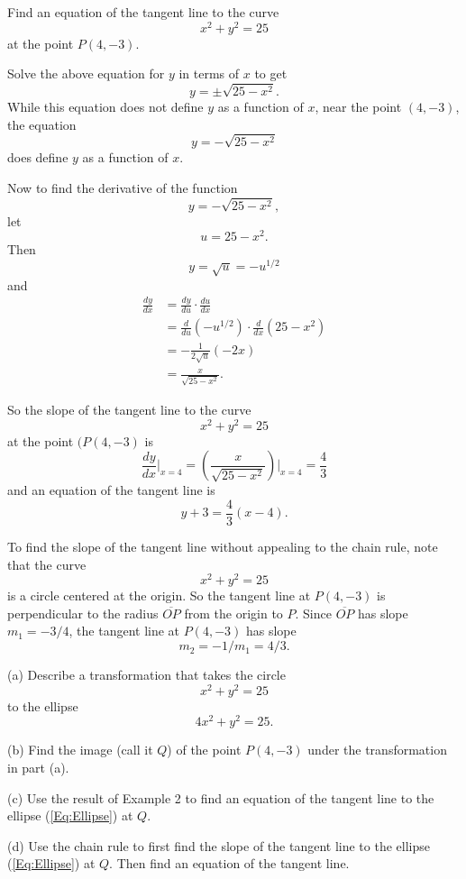 \documentclass{ximera}
\begin{document}
\begin{example}  \label{Ex:DFdg4ergg}
Find an equation of the tangent line to the curve
\[
     x^2 + y^2 = 25
\]
at the point $P(4,-3)$.

\begin{explanation}
Solve the above equation for $y$ in terms of $x$ to get
\[
      y = \pm \sqrt{25-x^2} .
\] 
While this equation does not define $y$ as a function of $x$, near the point $(4,-3)$, the equation
\[
         y = - \sqrt{25-x^2} 
\]
does define $y$ as a function of $x$.

Now to find the derivative of the function
\[
          y = - \sqrt{25-x^2} ,
\]
let 
\[
       u = 25 - x^2 .
\]
Then
\[
    y = \sqrt{u} = - u^{1/2}
\]
and 
\begin{align*}
\frac{dy}{dx} &= \frac{dy}{du} \cdot \frac{du}{dx}  \\
                     &= \frac{d}{du} \left(- u^{1/2} \right)  \cdot \frac{d}{dx}\left(  25-x^2 \right)  \\
                     &= -\frac{1}{2\sqrt{u}} (-2x)  \\
                     &= \frac{x}{\sqrt{25-x^2}}.
\end{align*}

So the slope of the tangent line to the curve
\[
       x^2 + y^2 =25
\]
at the point $(P(4,-3)$ is
\[
             \frac{dy}{dx}\Big|_{x=4} = \left(  \frac{x}{\sqrt{25-x^2}} \right) \Big|_{x=4} = \frac{4}{3}
\]
and an equation of the tangent line is
\[
     y +3 = \frac{4}{3} (x-4).
\]

To find the slope of the tangent line without appealing to the chain rule, note that the curve
\[
              x^2 + y^2  = 25
\]
is a circle centered at the origin. So the tangent line at $P(4,-3)$ is perpendicular to the radius $\overline{OP}$ from the origin to $P$. Since $\overline{OP}$ has slope $m_1 = -3/4$, the tangent line at $P(4,-3)$ has slope
\[
     m_2 = - 1 / m_1  = 4/3 .
\]
\end{explanation}
\end{example}


\begin{question}  \label{Ex:LKKkdftr}
(a) Describe a transformation that takes the circle
\[
     x^2 + y^2 = 25
\]
to the ellipse
\begin{equation}
     4x^2 + y^2 = 25.     \label{Eq:Ellipse}
\end{equation}

(b) Find the image (call it $Q$) of the point $P(4,-3)$ under the transformation in part (a).

(c) Use the result of Example 2 to find an equation of the tangent line to the ellipse (\ref{Eq:Ellipse}) at $Q$.

(d) Use the chain rule to first find the slope of the tangent line to the ellipse (\ref{Eq:Ellipse}) at $Q$. Then find an equation of the tangent line.

\end{question}
\end{document}
